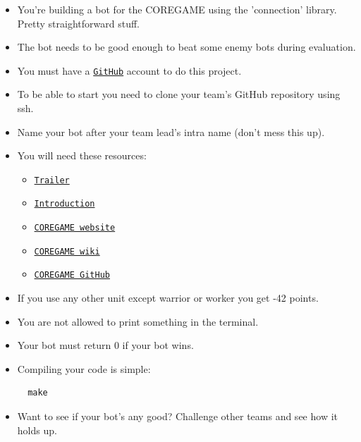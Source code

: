 \documentclass[12pt]{article}
\begin{document}
\begin{itemize}
  \item You're building a bot for the COREGAME using the 'connection' library. Pretty straightforward stuff.
  
  \item The bot needs to be good enough to beat some enemy bots during evaluation.
  
  \item You must have a \href{https://github.com}{\texttt{GitHub}} account to do this project.
  
  \item To be able to start you need to clone your team's GitHub repository using ssh.
  
  \item Name your bot after your team lead's intra name (don't mess this up).
  
  \item You will need these resources:
  \begin{itemize}
    \item \href{https://youtu.be/gMmBgHnb8Nc?si=Thm0HOCfNIZbfCnI}{\texttt{Trailer}}
    \item \href{https://shattereddisk.github.io/rickroll/rickroll.mp4}{\texttt{Introduction}}
    \item \href{https://coregame.de}{\texttt{COREGAME website}}
    \item \href{https://42core-team.github.io/rush02-wiki/#/}{\texttt{COREGAME wiki}}
    \item \href{https://github.com/42core-team}{\texttt{COREGAME GitHub}}
  \end{itemize}

  \item If you use any other unit except warrior or worker you get -42 points.
  
  \item You are not allowed to print something in the terminal.
  
  \item Your bot must return 0 if your bot wins.
  
  \newpage
  
  \item Compiling your code is simple:
  
  \begin{verbatim}
  make
  \end{verbatim}
  
  \item Want to see if your bot's any good? Challenge other teams and see how it holds up.
\end{itemize}
\end{document}
